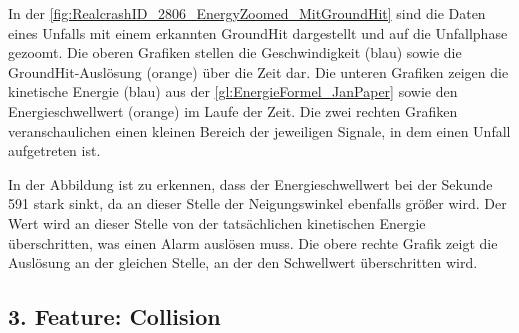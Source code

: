 
In der \autoref{fig:RealcrashID_2806_EnergyZoomed_MitGroundHit} sind die Daten eines Unfalls mit einem erkannten GroundHit dargestellt und auf die Unfallphase gezoomt. 
Die oberen Grafiken stellen die Geschwindigkeit (blau) sowie die GroundHit-Auslösung (orange) über die Zeit dar.
Die unteren Grafiken zeigen die kinetische Energie (blau) aus der \autoref{gl:EnergieFormel_JanPaper} sowie den Energieschwellwert (orange) im Laufe der Zeit.
Die zwei rechten Grafiken veranschaulichen einen kleinen Bereich der jeweiligen Signale, in dem einen Unfall aufgetreten ist.

In der Abbildung ist zu erkennen, dass der Energieschwellwert bei der Sekunde 591 stark sinkt, da an dieser Stelle der Neigungswinkel ebenfalls größer wird.
Der Wert wird an dieser Stelle von der tatsächlichen kinetischen Energie überschritten, was einen Alarm auslösen muss. Die obere rechte Grafik zeigt die Auslösung an der gleichen Stelle, an der den Schwellwert überschritten wird.



\subsection{3. Feature: Collision}


